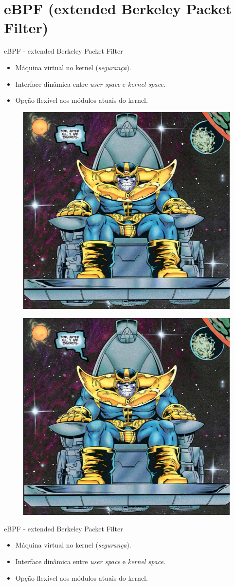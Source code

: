 \section{eBPF (extended Berkeley Packet Filter)}
\begin{frame}{eBPF - extended Berkeley Packet Filter}
\begin{itemize}
		\item Máquina virtual no kernel (\textit{segurança}).
		\item Interface dinâmica entre \textit{user space} e \textit{kernel space}.
		\item Opção flexível aos módulos atuais do kernel.
	\end{itemize} 
\begin{figure}
\centering
\begin{minipage}{.5\textwidth}
  \centering
  \includegraphics[width=.4\linewidth]{img/lorem-picsum.jpg}
  \label{fig:test1}
\end{minipage}%
\begin{minipage}{.5\textwidth}
  \centering
  \includegraphics[width=.4\linewidth]{img/lorem-picsum.jpg}
  \label{fig:test2}
\end{minipage}
\end{figure}	
\end{frame}

\begin{frame}{eBPF - extended Berkeley Packet Filter}
\begin{itemize}
		\item Máquina virtual no kernel (\textit{segurança}).
		\item Interface dinâmica entre \textit{user space} e \textit{kernel space}.
		\item Opção flexível aos módulos atuais do kernel.
	\end{itemize} 
\end{frame}

